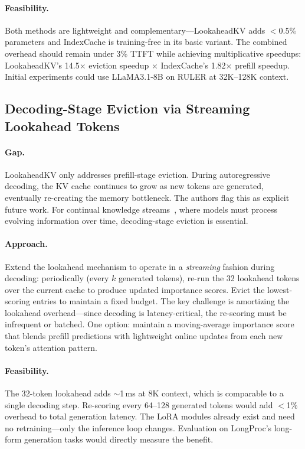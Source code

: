 \documentclass[11pt]{article}
\begin{document}
\paragraph{Feasibility.}
Both methods are lightweight and complementary---LookaheadKV adds $<$0.5\% parameters and IndexCache is training-free in its basic variant. The combined overhead should remain under 3\% TTFT while achieving multiplicative speedups: LookaheadKV's 14.5$\times$ eviction speedup $\times$ IndexCache's 1.82$\times$ prefill speedup. Initial experiments could use LLaMA3.1-8B on RULER at 32K--128K context.

\subsection{Decoding-Stage Eviction via Streaming Lookahead Tokens}

\paragraph{Gap.}
LookaheadKV only addresses prefill-stage eviction. During autoregressive decoding, the KV cache continues to grow as new tokens are generated, eventually re-creating the memory bottleneck. The authors flag this as explicit future work. For continual knowledge streams~\cite{oaks}, where models must process evolving information over time, decoding-stage eviction is essential.

\paragraph{Approach.}
Extend the lookahead mechanism to operate in a \emph{streaming} fashion during decoding: periodically (every $k$ generated tokens), re-run the 32 lookahead tokens over the current cache to produce updated importance scores. Evict the lowest-scoring entries to maintain a fixed budget. The key challenge is amortizing the lookahead overhead---since decoding is latency-critical, the re-scoring must be infrequent or batched. One option: maintain a moving-average importance score that blends prefill predictions with lightweight online updates from each new token's attention pattern.

\paragraph{Feasibility.}
The 32-token lookahead adds $\sim$1\,ms at 8K context, which is comparable to a single decoding step. Re-scoring every 64--128 generated tokens would add $<$1\% overhead to total generation latency. The LoRA modules already exist and need no retraining---only the inference loop changes. Evaluation on LongProc's long-form generation tasks would directly measure the benefit.
\end{document}
